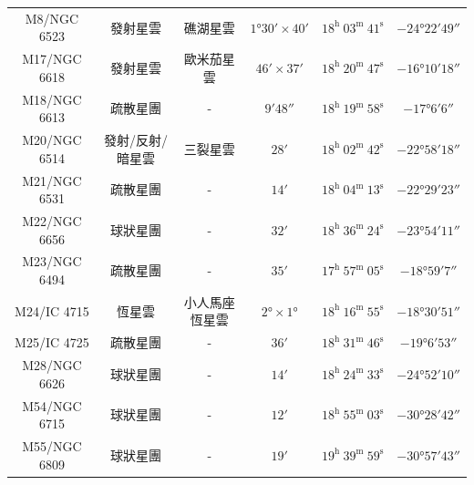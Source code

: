 \begin{center}
\begin{longtable}{c | c | c | c | c | c}
    M8/NGC 6523 & 發射星雲 & 礁湖星雲 & \(\ang{1;30;} \times \ang{;40;}\) & \(18^\text{h }03^\text{m }41^\text{s}\) & \(-\ang{24;22;49}\) \\ %
    M17/NGC 6618 & 發射星雲 & 歐米茄星雲 & \(\ang{;46;} \times \ang{;37;}\) & \(18^\text{h }20^\text{m }47^\text{s}\) & \(-\ang{16;10;18}\) \\ %
    M18/NGC 6613 & 疏散星團 & - & \(\ang{;9;48}\) & \(18^\text{h }19^\text{m }58^\text{s}\) & \(-\ang{17;6;6}\) \\ %
    M20/NGC 6514 & 發射/反射/暗星雲 & 三裂星雲 & \(\ang{;28;}\) & \(18^\text{h }02^\text{m }42^\text{s}\) & \(-\ang{22;58;18}\) \\ %
    M21/NGC 6531 & 疏散星團 & - & \(\ang{;14;}\) & \(18^\text{h }04^\text{m }13^\text{s}\) & \(-\ang{22;29;23}\) \\ %
    M22/NGC 6656 & 球狀星團 & - & \(\ang{;32;}\) & \(18^\text{h }36^\text{m }24^\text{s}\) & \(-\ang{23;54;11}\) \\ %
    M23/NGC 6494 & 疏散星團 & - & \(\ang{;35;}\) & \(17^\text{h }57^\text{m }05^\text{s}\) & \(-\ang{18;59;7}\) \\ %
    M24/IC 4715 & 恆星雲 & 小人馬座恆星雲 & \(\ang{2;;} \times \ang{1;;}\) & \(18^\text{h }16^\text{m }55^\text{s}\) & \(-\ang{18;30;51}\) \\ %
    M25/IC 4725 & 疏散星團 & - & \(\ang{;36;}\) & \(18^\text{h }31^\text{m }46^\text{s}\) & \(-\ang{19;6;53}\) \\ %
    M28/NGC 6626 & 球狀星團 & - & \(\ang{;14;}\) & \(18^\text{h }24^\text{m }33^\text{s}\) & \(-\ang{24;52;10}\) \\ %
    M54/NGC 6715 & 球狀星團 & - & \(\ang{;12;}\) & \(18^\text{h }55^\text{m }03^\text{s}\) & \(-\ang{30;28;42}\) \\ %
    M55/NGC 6809 & 球狀星團 & - & \(\ang{;19;}\) & \(19^\text{h }39^\text{m }59^\text{s}\) & \(-\ang{30;57;43}\) \\ %

\end{longtable}
\end{center}
